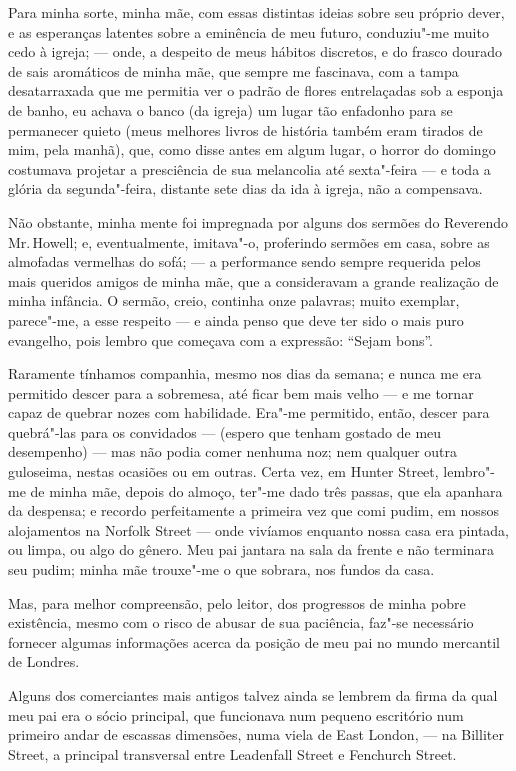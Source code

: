 Para minha sorte, minha mãe, com essas distintas ideias sobre seu
próprio dever, e as esperanças latentes sobre a eminência de meu futuro,
conduziu"-me muito cedo à igreja; --- onde, a despeito de meus hábitos
discretos, e do frasco dourado de sais aromáticos de minha mãe, que
sempre me fascinava, com a tampa desatarraxada que me permitia ver o
padrão de flores entrelaçadas sob a esponja de banho, eu achava o banco
(da igreja) um lugar tão enfadonho para se permanecer quieto (meus
melhores livros de história também eram tirados de mim, pela manhã),
que, como disse antes em algum lugar, o horror do domingo costumava
projetar a presciência de sua melancolia até sexta"-feira --- e toda a
glória da segunda"-feira, distante sete dias da ida à igreja, não a
compensava.

Não obstante, minha mente foi impregnada por alguns dos sermões do
Reverendo Mr.\,Howell; e, eventualmente, imitava"-o, proferindo sermões em
casa, sobre as almofadas vermelhas do sofá; --- a performance sendo sempre
requerida pelos mais queridos amigos de minha mãe, que a consideravam a
grande realização de minha infância. O sermão, creio, continha onze
palavras; muito exemplar, parece"-me, a esse respeito --- e ainda penso
que deve ter sido o mais puro evangelho, pois lembro que começava com a
expressão: ``Sejam bons''.

Raramente tínhamos companhia, mesmo nos dias da semana; e nunca me
era permitido descer para a sobremesa, até ficar bem mais velho --- e me
tornar capaz de quebrar nozes com habilidade. Era"-me permitido, então,
descer para quebrá"-las para os convidados --- (espero que tenham gostado
de meu desempenho) --- mas não podia comer nenhuma noz; nem qualquer
outra guloseima, nestas ocasiões ou em outras. Certa vez, em Hunter
Street, lembro"-me de minha mãe, depois do almoço, ter"-me dado três
passas, que ela apanhara da despensa; e recordo perfeitamente a primeira
vez que comi pudim, em nossos alojamentos na Norfolk Street --- onde
vivíamos enquanto nossa casa era pintada, ou limpa, ou algo do gênero.
Meu pai jantara na sala da frente e não terminara seu pudim; minha mãe
trouxe"-me o que sobrara, nos fundos da casa.

Mas, para melhor compreensão, pelo leitor, dos progressos de minha
pobre existência, mesmo com o risco de abusar de sua paciência, faz"-se
necessário fornecer algumas informações acerca da posição de meu pai no
mundo mercantil de Londres.

Alguns dos comerciantes mais antigos talvez ainda se lembrem da firma da
qual meu pai era o sócio principal, que funcionava num pequeno
escritório num primeiro andar de escassas dimensões, numa viela de East
London, --- na Billiter Street, a principal transversal entre Leadenfall
Street e Fenchurch Street.

